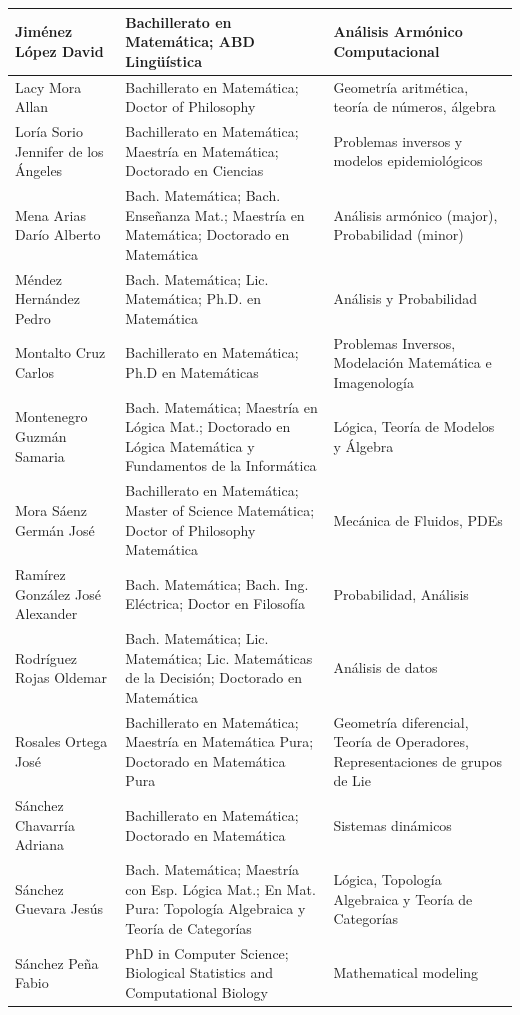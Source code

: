 \begin{landscape}
\begin{longtable}{|>{\raggedright\arraybackslash}p{5cm}|>{\raggedright\arraybackslash}p{9.8cm}|>{\raggedright\arraybackslash}p{5.6cm}|}
\hline
Jiménez López David & Bachillerato en Matemática; ABD Lingüística & Análisis Armónico Computacional \\
\hline
Lacy Mora Allan & Bachillerato en Matemática; Doctor of Philosophy & Geometría aritmética, teoría de números, álgebra \\
\hline
Loría Sorio Jennifer de los Ángeles & Bachillerato en Matemática; Maestría en Matemática; Doctorado en Ciencias & Problemas inversos y modelos epidemiológicos \\
\hline
Mena Arias Darío Alberto & Bach. Matemática; Bach. Enseñanza Mat.; Maestría en Matemática; Doctorado en Matemática & Análisis armónico (major), Probabilidad (minor) \\
\hline
Méndez Hernández Pedro & Bach. Matemática; Lic. Matemática; Ph.D. en Matemática & Análisis y Probabilidad \\
\hline
Montalto Cruz Carlos & Bachillerato en Matemática; Ph.D en Matemáticas & Problemas Inversos, Modelación Matemática e Imagenología \\
\hline
Montenegro Guzmán Samaria & Bach. Matemática; Maestría en Lógica Mat.; Doctorado en Lógica Matemática y Fundamentos de la Informática & Lógica, Teoría de Modelos y Álgebra \\
\hline
Mora Sáenz Germán José & Bachillerato en Matemática; Master of Science Matemática; Doctor of Philosophy Matemática & Mecánica de Fluidos, PDEs \\
\hline
Ramírez González José Alexander & Bach. Matemática; Bach. Ing. Eléctrica; Doctor en Filosofía & Probabilidad, Análisis \\
\hline
Rodríguez Rojas Oldemar & Bach. Matemática; Lic. Matemática; Lic. Matemáticas de la Decisión; Doctorado en Matemática & Análisis de datos \\
\hline
Rosales Ortega José & Bachillerato en Matemática; Maestría en Matemática Pura; Doctorado en Matemática Pura & Geometría diferencial, Teoría de Operadores, Representaciones de grupos de Lie \\
\hline
Sánchez Chavarría Adriana & Bachillerato en Matemática; Doctorado en Matemática & Sistemas dinámicos \\
\hline
Sánchez Guevara Jesús & Bach. Matemática; Maestría con Esp. Lógica Mat.; En Mat. Pura: Topología Algebraica y Teoría de Categorías & Lógica, Topología Algebraica y Teoría de Categorías \\
\hline
Sánchez Peña Fabio & PhD in Computer Science; Biological Statistics and Computational Biology & Mathematical modeling \\

\end{longtable}
\end{landscape}
